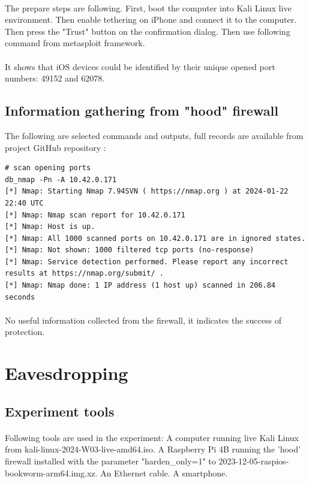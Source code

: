 \documentclass[mscthesis]{usiinfthesis}
\begin{document}
\paragraph{}
The prepare steps are following. First, boot the computer into Kali Linux live environment. Then enable tethering on iPhone and connect it to the computer. Then press the "Trust" button on the confirmation dialog. Then use following command from metasploit framework.
\paragraph{}
It shows that iOS devices could be identified by their unique opened port numbers: 49152 and 62078.

\subsection{Information gathering from "hood" firewall}
The following are selected commands and outputs, full records are available from project GitHub repository \citep{hood:github}:

\begin{lstlisting}[language={},frame=single,breaklines=true,postbreak=\mbox{\textcolor{red}{$\hookrightarrow$}\space}]
# scan opening ports
db_nmap -Pn -A 10.42.0.171
[*] Nmap: Starting Nmap 7.94SVN ( https://nmap.org ) at 2024-01-22 22:40 UTC
[*] Nmap: Nmap scan report for 10.42.0.171
[*] Nmap: Host is up.
[*] Nmap: All 1000 scanned ports on 10.42.0.171 are in ignored states.
[*] Nmap: Not shown: 1000 filtered tcp ports (no-response)
[*] Nmap: Service detection performed. Please report any incorrect results at https://nmap.org/submit/ .
[*] Nmap: Nmap done: 1 IP address (1 host up) scanned in 206.84 seconds
\end{lstlisting}
\paragraph{}
No useful information collected from the firewall, it indicates the success of protection.

\section{Eavesdropping}

\subsection{Experiment tools}
\paragraph{}
Following tools are used in the experiment: A computer running live Kali Linux from kali-linux-2024-W03-live-amd64.iso. A Raspberry Pi 4B running the 'hood' firewall installed with the parameter "harden\_only=1" to 2023-12-05-raspios-bookworm-arm64.img.xz. An Ethernet cable. A smartphone.
\end{document}
